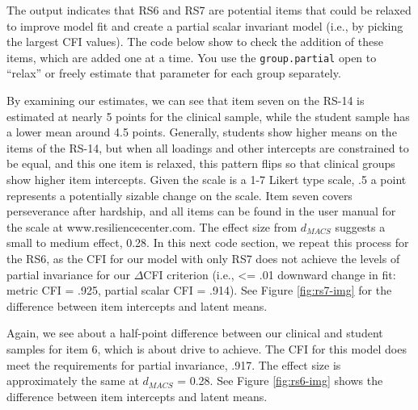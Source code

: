 \documentclass[
  man,floatsintext]{apa7}
\begin{document}
The output indicates that RS6 and RS7 are potential items that could be relaxed to improve model fit and create a partial scalar invariant model (i.e., by picking the largest CFI values). The code below show to check the addition of these items, which are added one at a time. You use the \texttt{group.partial} open to ``relax'' or freely estimate that parameter for each group separately.

By examining our estimates, we can see that item seven on the RS-14 is estimated at nearly 5 points for the clinical sample, while the student sample has a lower mean around 4.5 points. Generally, students show higher means on the items of the RS-14, but when all loadings and other intercepts are constrained to be equal, and this one item is relaxed, this pattern flips so that clinical groups show higher item intercepts. Given the scale is a 1-7 Likert type scale, .5 a point represents a potentially sizable change on the scale. Item seven covers perseverance after hardship, and all items can be found in the user manual for the scale at www.resiliencecenter.com. The effect size from \(d_{MACS}\) suggests a small to medium effect, 0.28. In this next code section, we repeat this process for the RS6, as the CFI for our model with only RS7 does not achieve the levels of partial invariance for our \(\Delta\)CFI criterion (i.e., \textless= .01 downward change in fit: metric CFI = .925, partial scalar CFI = .914). See Figure \ref{fig:rs7-img} for the difference between item intercepts and latent means.

Again, we see about a half-point difference between our clinical and student samples for item 6, which is about drive to achieve. The CFI for this model does meet the requirements for partial invariance, .917. The effect size is approximately the same at \(d_{MACS}\) = 0.28. See Figure \ref{fig:rs6-img} shows the difference between item intercepts and latent means.
\end{document}

